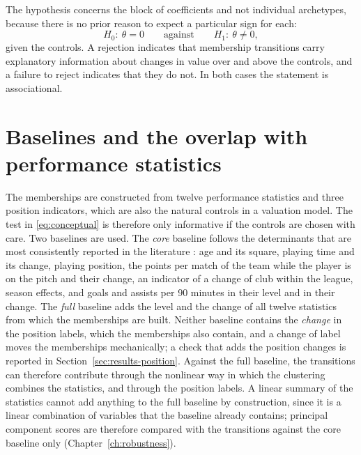 The hypothesis concerns the block of coefficients and not individual archetypes, because there is no prior reason to expect a particular sign for each:
\begin{equation}
	H_0:\ \theta=0 \qquad\text{against}\qquad H_1:\ \theta\neq 0,
\end{equation}
given the controls. A rejection indicates that membership transitions carry explanatory information about changes in value over and above the controls, and a failure to reject indicates that they do not. In both cases the statement is associational.

\section{Baselines and the overlap with performance statistics}
\label{sec:theory-baselines}

The memberships are constructed from twelve performance statistics and three position indicators, which are also the natural controls in a valuation model. The test in \eqref{eq:conceptual} is therefore only informative if the controls are chosen with care. Two baselines are used. The \emph{core} baseline follows the determinants that are most consistently reported in the literature \cite{franceschi2024determinants}: age and its square, playing time and its change, playing position, the points per match of the team while the player is on the pitch and their change, an indicator of a change of club within the league, season effects, and goals and assists per 90 minutes in their level and in their change. The \emph{full} baseline adds the level and the change of all twelve statistics from which the memberships are built. Neither baseline contains the \emph{change} in the position labels, which the memberships also contain, and a change of label moves the memberships mechanically; a check that adds the position changes is reported in Section~\ref{sec:results-position}. Against the full baseline, the transitions can therefore contribute through the nonlinear way in which the clustering combines the statistics, and through the position labels. A linear summary of the statistics cannot add anything to the full baseline by construction, since it is a linear combination of variables that the baseline already contains; principal component scores are therefore compared with the transitions against the core baseline only (Chapter~\ref{ch:robustness}).

